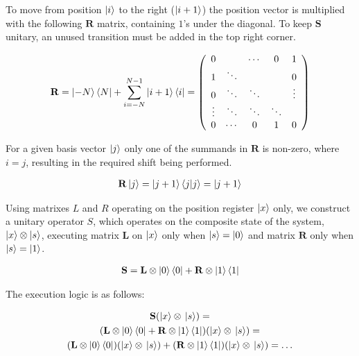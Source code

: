\begin{definition}

To move from position $\ket{i}$ to the right ($\ket{i+1}$) the position vector is multiplied with the following $\mathbf{R}$ matrix, containing $1$'s under the diagonal. To keep $\mathbf{S}$ unitary, an unused transition must be added in the top right corner.


\begin{align}
\label{RightShift}
\mathbf{R} = \ket{-N}\bra{N} + \sum\limits_{i=-N}^{N-1} \ket{i+1}\bra{i} =
\left(
    \begin{array}{ccccc}
        0      &        & \cdots & 0      & 1      \\
        1      & \ddots &        &        & 0      \\
        0      & \ddots & \ddots &        & \vdots \\
        \vdots & \ddots & \ddots & \ddots &        \\
        0      & \cdots & 0      & 1      & 0
      \end{array}
\right)
\end{align}

For a given basis vector $\ket{j}$ only one of the summands in $\mathbf{R}$ is non-zero, where $i=j$, resulting in the required shift being performed.

\begin{align*}
\mathbf{R}\ket{j} = \ket{j+1}\bra{j}\ket{j} = \ket{j+1}
\end{align*}

\end{definition}


Using matrixes $L$ and $R$ operating on the position register $\ket{x}$ only, we construct a unitary operator $S$, which operates on the composite state of the system, $\ket{x} \otimes \ket{s}$, executing matrix $\mathbf{L}$ on $\ket{x}$ only when $\ket{s} = \ket{0}$ and matrix $\mathbf{R}$ only when $\ket{s}=\ket{1}$.

\begin{align}
\label{ShiftOperator}
  \mathbf{S} = \mathbf{L}\otimes\ket{0}\bra{0} + \mathbf{R}\otimes\ket{1}\bra{1}
\end{align}

The execution logic is as follows:

\begin{gather*}
    \mathbf{S}(\ket{x}\otimes{}\ket{s}) = \\
    (\mathbf{L}\otimes\ket{0}\bra{0} + \mathbf{R}\otimes\ket{1}\bra{1})(\ket{x}\otimes{}\ket{s}) = \\ (\mathbf{L}\otimes\ket{0}\bra{0})(\ket{x}\otimes{}\ket{s}) + (\mathbf{R}\otimes\ket{1}\bra{1})(\ket{x}\otimes{}\ket{s}) = \dots
\end{gather*}

